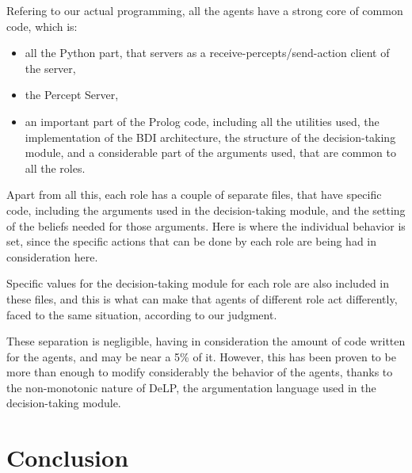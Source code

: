 \documentclass{llncs2e/llncs}
\begin{document}
    Refering to our actual programming, all the agents have a strong core of common
    code, which is:
    
    \begin{itemize}
        \item all the Python part, that servers as a receive-percepts/send-action client 
        of the server,
        
        \item the Percept Server,
        
        \item an important part of the Prolog code, including all the utilities used, the
        implementation of the BDI architecture, the structure of the 
        decision-taking module, and a considerable part of the arguments used, that
        are common to all the roles.
    \end{itemize}
    
    Apart from all this, each role has a couple of separate files, that have 
    specific code, including the arguments used in the decision-taking module, and
    the setting of the beliefs needed for those arguments. Here is where the 
    individual behavior is set, since the specific actions that can be done by each
    role are being had in consideration here.
    
    Specific values for the decision-taking module for each role are also included
    in these files, and this is what can make that agents of different role act 
    differently, faced to the same situation, according to our judgment.
    
    These separation is negligible, having in consideration the amount of code 
    written for the agents, and may be near a 5\% of it. However, this has been proven to
    be more than enough to modify considerably the behavior of the agents, thanks to
    the non-monotonic nature of DeLP, the argumentation language used in the 
    decision-taking module.

\section{Conclusion}

    
\end{document}
